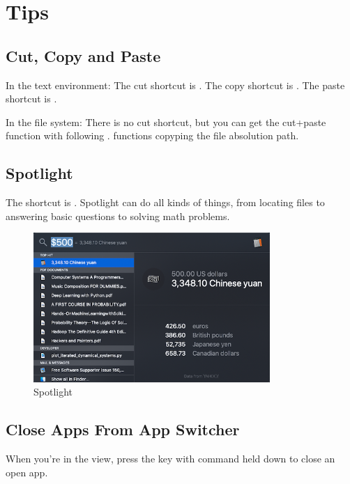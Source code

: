 
\chapter{Tips}


\section{Cut, Copy and Paste}
In the text environment:
The cut shortcut is .
The copy shortcut is .
The paste shortcut is .

In the file system:
There is no cut shortcut, but you can get the cut+paste function with  following .
 functions copyping the file absolution path.



\section{Spotlight}

The shortcut is . Spotlight can do all kinds of things, from locating files to answering basic questions to solving math problems.

\begin{figure}[H]
  \centering
  \includegraphics[width=0.8\textwidth]{spotlight.png}
  \caption{Spotlight}
\end{figure}

\section{Close Apps From App Switcher}

When you're in the  view, press the  key with command held down to close an open app.


